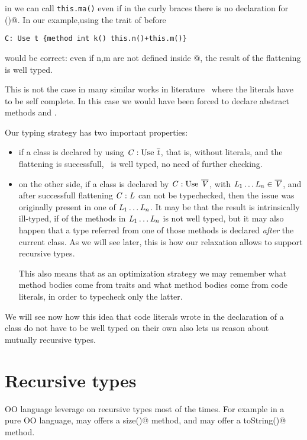 \noindent in \Q@B@ we can call \lstinline{this.ma()} even if in the curly braces there is no declaration for \Q@ma()@.
In our example,using the trait \Q@t@ of before

\begin{lstlisting}
C: Use t {method int k() this.n()+this.m()}
\end{lstlisting}
\noindent would be correct: even if n,m are not defined inside
@,
the result of the flattening is well typed.

This is not the case in many similar works in literature~\cite{} where the
literals have to be self complete. In this case we would have been forced to
declare abstract methods \Q@n@ and \Q@m@.

Our typing strategy has two important properties:
\begin{itemize}
\item if a class is declared by using $\mC : \use\ \overline\mt$, that is, without literals,
and the flattening is successfull, \mC\ is well typed, no need of further checking.
\item on the other side, if a class is declared by $\mC : \use\ \overline\mV$, with
$\mathit{L}_1\ldots\mathit{L}_n \in \overline{\mathit{V}}$, and after successfull flattening $\mathit{C} : \mathit{L}$ can not be typechecked,
then the issue was originally present in one of $\mathit{L}_1\ldots\mathit{L}_n$.
It may be that the result is intrinsically ill-typed, if of the methods in $\mathit{L}_1\ldots\mathit{L}_n$ is not well typed,
but it may also happen that a type referred from one of those methods is declared \emph{after} the current class. As we will see later, this is how our relaxation allows to support recursive types.

This also means that as an optimization strategy
 we may remember what method bodies come from traits and what method bodies come from code literals, in order to typecheck only the latter.
 \end{itemize}

We will see now how this idea that code literals wrote in the declaration of a class
do not have to be well typed on their own also lets us reason about mutually recursive types.

 \section{Recursive types}

OO language leverage on recursive types most of the times.
For example in a pure OO language, \Q@String@ may offers a \Q@Int size()@
method, and \Q@Int@ may offer a \Q@String toString()@ method.

